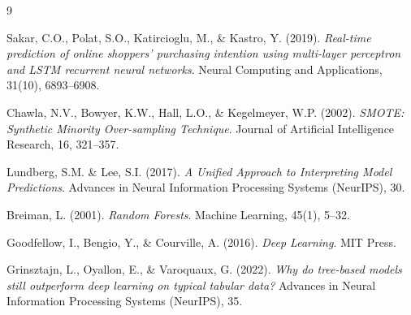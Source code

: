 \begin{thebibliography}{9}

Sakar, C.O., Polat, S.O., Katircioglu, M., \& Kastro, Y. (2019).
\textit{Real-time prediction of online shoppers' purchasing intention using multi-layer perceptron and LSTM recurrent neural networks}.
Neural Computing and Applications, 31(10), 6893--6908.

Chawla, N.V., Bowyer, K.W., Hall, L.O., \& Kegelmeyer, W.P. (2002).
\textit{SMOTE: Synthetic Minority Over-sampling Technique}.
Journal of Artificial Intelligence Research, 16, 321--357.

Lundberg, S.M. \& Lee, S.I. (2017).
\textit{A Unified Approach to Interpreting Model Predictions}.
Advances in Neural Information Processing Systems (NeurIPS), 30.

Breiman, L. (2001).
\textit{Random Forests}.
Machine Learning, 45(1), 5--32.

Goodfellow, I., Bengio, Y., \& Courville, A. (2016).
\textit{Deep Learning}.
MIT Press.

Grinsztajn, L., Oyallon, E., \& Varoquaux, G. (2022).
\textit{Why do tree-based models still outperform deep learning on typical tabular data?}
Advances in Neural Information Processing Systems (NeurIPS), 35.

\end{thebibliography}

